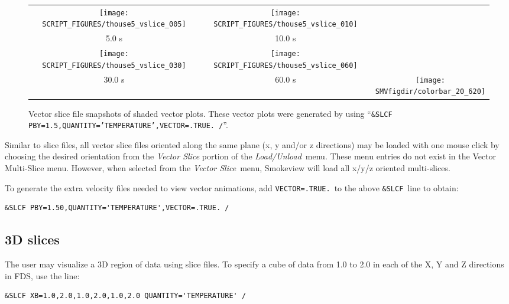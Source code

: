 \documentclass[11pt,twoside]{book}
\newcommand{\figheightAbar}{2.2in}
\begin{document}
\begin{figure}[bph]
\begin{center}
\begin{tabular}{ccc}
\texttt{[image: SCRIPT\_FIGURES/thouse5\_vslice\_005]}&
\texttt{[image: SCRIPT\_FIGURES/thouse5\_vslice\_010]}\\
5.0 s&10.0 s\\
\texttt{[image: SCRIPT\_FIGURES/thouse5\_vslice\_030]}&
\texttt{[image: SCRIPT\_FIGURES/thouse5\_vslice\_060]}\\
30.0 s&60.0 s
&\raisebox{0.0ex}[0pt]{\texttt{[image: \\SMVfigdir/colorbar\_20\_620]}}\\
\end{tabular}
\end{center}
\caption [Vector slice file snapshots of shaded vector plots.]
{Vector slice file snapshots of shaded vector plots. These vector
plots were generated by using ``{\tt \&SLCF
PBY=1.5,QUANTITY='TEMPERATURE',VECTOR=.TRUE. /}''.}
\label{figvslice}%
\end{figure}

Similar to slice files, all vector slice files oriented along the same plane (x, y and/or z directions) may be loaded
with one mouse click by choosing the desired orientation from the {\em Vector Slice}
portion of the {\em Load/Unload}\ menu.  These menu entries do not exist in the Vector Multi-Slice menu.
However, when selected from the {\em Vector Slice}\ menu, Smokeview will load all x/y/z oriented multi-slices.

To generate the extra velocity files needed to view vector
animations, add {\tt VECTOR=.TRUE.}\ to the above {\tt \&SLCF}\ line
to obtain:
\begin{lstlisting}
&SLCF PBY=1.50,QUANTITY='TEMPERATURE',VECTOR=.TRUE. /
\end{lstlisting}

\subsection{3D slices}
The user may visualize a 3D region of data using slice files.
To specify a cube of data from 1.0 to 2.0 in each
of the X, Y and Z directions in FDS, use the line:
\begin{lstlisting}
&SLCF XB=1.0,2.0,1.0,2.0,1.0,2.0 QUANTITY='TEMPERATURE' /
\end{lstlisting}
\end{document}
